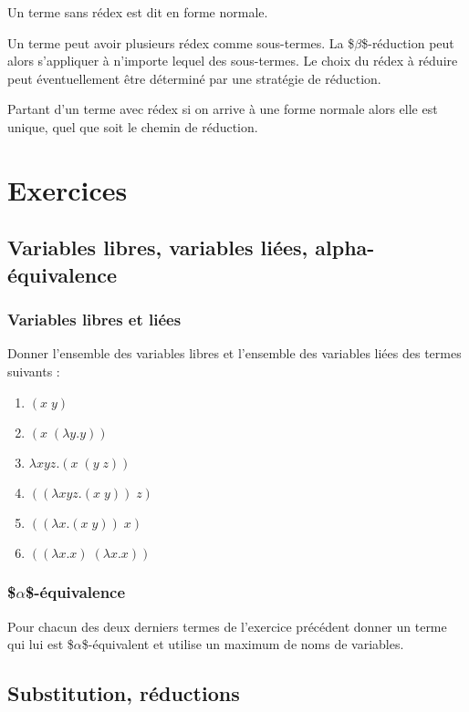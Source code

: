 \documentclass[11pt, a4paper]{article}
\begin{document}
\begin{multicols}{2}
Un terme sans rédex est dit en forme normale.

Un terme peut avoir plusieurs rédex comme sous-termes. La
\$\(\beta\)\$-réduction peut alors s'appliquer à n'importe lequel des
sous-termes. Le choix du rédex à réduire peut éventuellement être déterminé
par une stratégie de réduction.

Partant d'un terme avec rédex si on arrive à une forme normale alors elle
est unique, quel que soit le chemin de réduction.

\end{multicols}

\section{Exercices}
\label{sec:org6aa5038}

\subsection{Variables libres, variables liées, alpha-équivalence}
\label{sec:orgc64374a}
\subsubsection{Variables libres et liées}
\label{sec:orgfa2af5d}
Donner l'ensemble des variables libres et l'ensemble des variables liées
des termes suivants :
\begin{multicols}{3}
\begin{enumerate}
\item \((x\; y)\)
\item \((x\; (\lambda y. y))\)
\item \(\lambda xyz. (x\; (y\; z))\)
\item \(((\lambda xyz. (x\; y))\; z)\)
\item \(((\lambda x. (x\; y))\; x)\)
\item \(((\lambda x. x)\;(\lambda x. x))\)
\end{enumerate}
\end{multicols}
\subsubsection{\$\(\alpha\)\$-équivalence}
\label{sec:org9fcfdc6}
Pour chacun des deux derniers termes de l'exercice précédent donner un terme qui lui est
\$\(\alpha\)\$-équivalent et utilise un maximum de noms de variables.
\subsection{Substitution, réductions}
\label{sec:orgf10ca7b}
\end{document}
